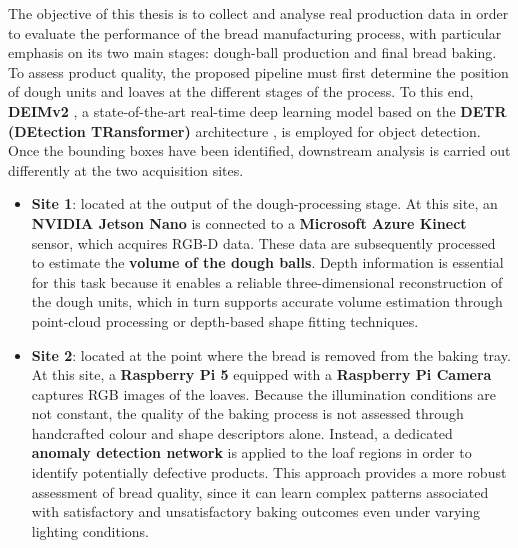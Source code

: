 
The objective of this thesis is to collect and analyse real production data in order to evaluate the performance of the bread manufacturing process, with particular emphasis on its two main stages: dough-ball production and final bread baking.
To assess product quality, the proposed pipeline must first determine the position of dough units and loaves at the different stages of the process.
To this end, \textbf{DEIMv2} \cite{huang_real-time_2026}, a state-of-the-art real-time deep learning model based on the \textbf{DETR (DEtection TRansformer)} architecture \cite{zhao_detrs_2024}, is employed for object detection.
Once the bounding boxes have been identified, downstream analysis is carried out differently at the two acquisition sites.
\begin{itemize}
    \item \textbf{Site 1}: located at the output of the dough-processing stage.
    At this site, an \textbf{NVIDIA Jetson Nano} \cite{nvidia_corporation_jetson_nodate} is connected to a \textbf{Microsoft Azure Kinect} \cite{microsoft_azure_nodate} sensor, which acquires RGB-D data. These data are subsequently processed to estimate the \textbf{volume of the dough balls}. Depth information is essential for this task because it enables a reliable three-dimensional reconstruction of the dough units, which in turn supports accurate volume estimation through point-cloud processing or depth-based shape fitting techniques.

    \item \textbf{Site 2}: located at the point where the bread is removed from the baking tray.
    At this site, a \textbf{Raspberry Pi 5} equipped with a \textbf{Raspberry Pi Camera} captures RGB images of the loaves. Because the illumination conditions are not constant, the quality of the baking process is not assessed through handcrafted colour and shape descriptors alone. Instead, a dedicated \textbf{anomaly detection network} is applied to the loaf regions in order to identify potentially defective products. This approach provides a more robust assessment of bread quality, since it can learn complex patterns associated with satisfactory and unsatisfactory baking outcomes even under varying lighting conditions.
\end{itemize}

